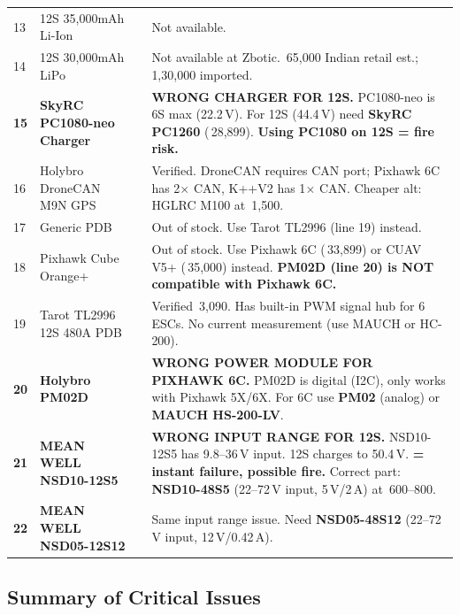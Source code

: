 \documentclass[11pt,a4paper]{article}
\newcommand{\ok} {\textcolor{green!50!black}{\ding{51}}}
\newcommand{\bad}{\textcolor{red}{\ding{55}}}
\newcommand{\na} {\textcolor{gray!80!black}{\ding{109}}}
\newcommand{\Rs}{\rupee\,}
\begin{document}
\begin{xltabular}{\linewidth}{C{0.6cm}L{4.0cm}C{1.6cm}L{8.0cm}@{}}
13 & 12S 35,000mAh Li-Ion & \na & Not available. \\
14 & 12S 30,000mAh LiPo & \na & Not available at Zbotic. \Rs{}65,000 Indian retail est.; \Rs{}1,30,000 imported. \\
\textbf{15} & \textbf{SkyRC PC1080-neo Charger} & \bad & \textbf{WRONG CHARGER FOR 12S.} PC1080-neo is 6S max (22.2\,V). For 12S (44.4\,V) need \textbf{SkyRC PC1260} (\Rs{}28,899). \textbf{Using PC1080 on 12S = fire risk.} \\
16 & Holybro DroneCAN M9N GPS & \ok & Verified. DroneCAN requires CAN port; Pixhawk 6C has 2$\times$ CAN, K++V2 has 1$\times$ CAN. Cheaper alt: HGLRC M100 at \Rs{}1,500. \\
17 & Generic PDB & \na & Out of stock. Use Tarot TL2996 (line 19) instead. \\
18 & Pixhawk Cube Orange+ & \na & Out of stock. Use Pixhawk 6C (\Rs{}33,899) or CUAV V5+ (\Rs{}35,000) instead. \textbf{PM02D (line 20) is NOT compatible with Pixhawk 6C.} \\
19 & Tarot TL2996 12S 480A PDB & \ok & Verified \Rs{}3,090. Has built-in PWM signal hub for 6 ESCs. No current measurement (use MAUCH or HC-200). \\
\textbf{20} & \textbf{Holybro PM02D} & \bad & \textbf{WRONG POWER MODULE FOR PIXHAWK 6C.} PM02D is digital (I2C), only works with Pixhawk 5X/6X. For 6C use \textbf{PM02} (analog) or \textbf{MAUCH HS-200-LV}. \\
\textbf{21} & \textbf{MEAN WELL NSD10-12S5} & \bad & \textbf{WRONG INPUT RANGE FOR 12S.} NSD10-12S5 has 9.8--36\,V input. 12S charges to 50.4\,V. \textbf{= instant failure, possible fire.} Correct part: \textbf{NSD10-48S5} (22--72\,V input, 5\,V/2\,A) at \Rs{}600--800. \\
\textbf{22} & \textbf{MEAN WELL NSD05-12S12} & \bad & Same input range issue. Need \textbf{NSD05-48S12} (22--72\,V input, 12\,V/0.42\,A). \\
\bottomrule
\end{xltabular}

\subsection{Summary of Critical Issues}
\end{document}
